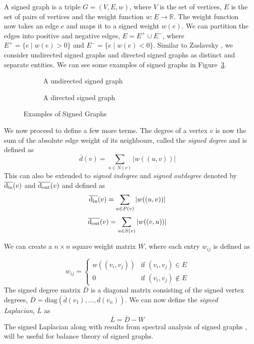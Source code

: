 A signed graph is a triple $G=(V,E,w)$, where $V$ is the set of vertices, $E$ is the set of pairs of vertices and the weight function $w:E \rightarrow \mathbb{R}$.
The weight function now takes an edge $e$ and maps it to a signed weight $w(e)$.
We can partition the edges into positive and negative edges, $E = E^{+}\cup E^{-}$, where $E^{+} = \{e \mid w(e)>0\}$ and $E^{-}=\{e \mid w(e)<0\}$.
Similar to Zaslavsky \cite{zaslavsky1982signed}, we consider undirected signed graphs and directed signed graphs as distinct and separate entities.
We can see some examples of signed graphs in Figure~\ref{fig:signed-graphs}.
\begin{figure}[!ht]
    \centering
    \begin{subfigure}{0.5\textwidth}
        \centering
        
        \caption{A undirected signed graph}
        \label{fig:signed-undirected}
    \end{subfigure}

    \begin{subfigure}{0.5\textwidth}
        \centering
        
        \caption{A directed signed graph}
        \label{fig:signed-directed graph}
    \end{subfigure}
    \caption{Examples of Signed Graphs}
    \label{fig:signed-graphs}
\end{figure}

We now proceed to define a few more terms.
The degree of a vertex $v$ is now the sum of the absolute edge weight of its neighbours, called the \textit{signed degree} and is defined as 
\[
    \overline{d}(v) = \sum_{u \in N(v)}|w((u,v))|
\] 
This can also be extended to \textit{signed indegree} and \textit{signed outdegree} denoted by $\overline{\operatorname*{d_{\text{in}}}}(v)$ and $\overline{\operatorname*{d_{\text{out}}}}(v)$ and defined as
\[
    \overline{\operatorname*{d_{\text{in}}}}(v)=\sum_{u \in P(v)}|w((u,v))|
\] 
\[
    \overline{\operatorname*{d_{\text{out}}}}(v)=\sum_{u \in S(v)}|w((v,u))|
\] 

We can create a $n \times n$ square weight matrix $W$, where each entry $w_{ij}$ is defined as 

\[ w_{ij} = 
\begin{cases}
    w((v_i,v_j)) & \text{if } (v_i,v_j) \in E \\
    0 & \text{if } (v_i,v_j) \notin E      
\end{cases}
\] 
The signed degree matrix $\overline{D}$ is a diagonal matrix consisting of the signed vertex degrees, $\overline{D} = \text{diag}(\overline{d}(v_{1}),\dots,d(v_n))$.
We can now define the \textit{signed Laplacian}, $\overline{L}$ as 
\[ \overline{L} = \overline{D} - W\]
The signed Laplacian along with results from spectral analysis of signed graphs \cite{hou2005bounds,kunegis2010spectral}, will be useful for balance theory of signed graphs. 

